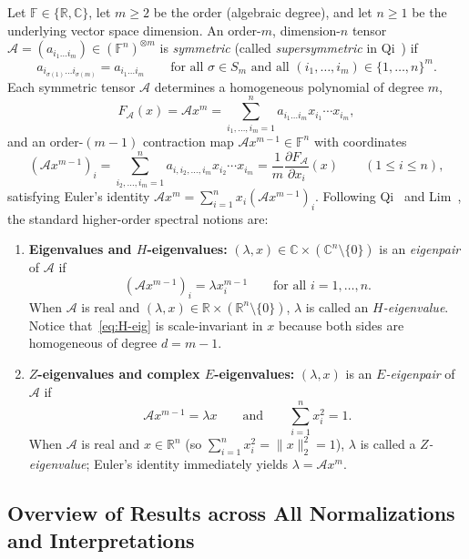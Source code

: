 \documentclass[11pt]{article}
\theoremstyle{definition}
\newcommand{\R}{\mathbb{R}}
\newcommand{\C}{\mathbb{C}}
\newcommand{\cA}{\mathcal{A}}
\begin{document}
Let $\mathbb{F} \in \{\R, \C\}$, let $m \ge 2$ be the order (algebraic degree), and let
$n \ge 1$ be the underlying vector space dimension. An order-$m$, dimension-$n$ tensor
$\cA = (a_{i_1 \dots i_m}) \in (\mathbb{F}^n)^{\otimes m}$ is \emph{symmetric}
(called \emph{supersymmetric} in Qi~\cite{Qi2005}) if
\[
  a_{i_{\sigma(1)} \dots i_{\sigma(m)}} = a_{i_1 \dots i_m}
  \qquad \text{for all } \sigma \in S_m \text{ and all } (i_1, \dots, i_m) \in \{1, \dots, n\}^m.
\]
Each symmetric tensor $\cA$ determines a homogeneous polynomial of degree $m$,
\[
  F_{\cA}(x) = \cA x^m = \sum_{i_1, \dots, i_m = 1}^n a_{i_1 \dots i_m} x_{i_1} \cdots x_{i_m},
\]
and an order-$(m-1)$ contraction map $\cA x^{m-1} \in \mathbb{F}^n$ with coordinates
\[
  (\cA x^{m-1})_i = \sum_{i_2, \dots, i_m = 1}^n a_{i, i_2, \dots, i_m} x_{i_2} \cdots x_{i_m}
  = \frac{1}{m} \frac{\partial F_{\cA}}{\partial x_i}(x)
  \qquad (1 \le i \le n),
\]
satisfying Euler's identity $\cA x^m = \sum_{i=1}^n x_i (\cA x^{m-1})_i$. Following
Qi~\cite{Qi2005} and Lim~\cite{Lim2005}, the standard higher-order spectral notions are:
\begin{enumerate}
  \item \textbf{Eigenvalues and $H$-eigenvalues:} $(\lambda, x) \in \C \times (\C^n \setminus \{0\})$
  is an \emph{eigenpair} of $\cA$ if
  \begin{equation}\label{eq:H-eig}
    (\cA x^{m-1})_i = \lambda x_i^{m-1} \qquad \text{for all } i = 1, \dots, n.
  \end{equation}
  When $\cA$ is real and $(\lambda, x) \in \R \times (\R^n \setminus \{0\})$, $\lambda$ is
  called an \emph{$H$-eigenvalue}. Notice that~\eqref{eq:H-eig} is scale-invariant in $x$
  because both sides are homogeneous of degree $d = m - 1$.
  \item \textbf{$Z$-eigenvalues and complex $E$-eigenvalues:} $(\lambda, x)$ is an
  \emph{$E$-eigenpair} of $\cA$ if
  \begin{equation}\label{eq:ZE-eig}
    \cA x^{m-1} = \lambda x \qquad \text{and} \qquad \sum_{i=1}^n x_i^2 = 1.
  \end{equation}
  When $\cA$ is real and $x \in \R^n$ (so $\sum_{i=1}^n x_i^2 = \|x\|_2^2 = 1$), $\lambda$
  is called a \emph{$Z$-eigenvalue}; Euler's identity immediately yields $\lambda = \cA x^m$.
\end{enumerate}

\subsection{Overview of Results across All Normalizations and Interpretations}
\end{document}
